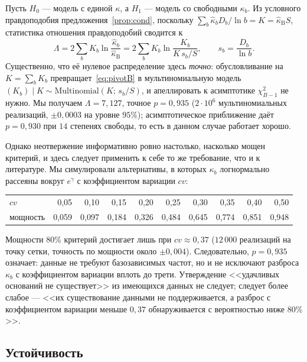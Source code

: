 \documentclass[11pt,a4paper]{article}
\theoremstyle{plain}
\theoremstyle{remark}
\newcommand{\eg}{e^{\gamma}}
\begin{document}
Пусть $H_0$ --- модель с единой $\kappa$, а $H_1$ --- модель со свободными $\kappa_b$.
Из условного правдоподобия предложения~\ref{prop:cond}, поскольку
$\sum_b\hat\kappa_bD_b/\ln b=K=\hat\kappa_{\mathrm B}S$, статистика
отношения правдоподобий сводится к
\begin{equation}\label{eq:LR}
\Lambda=2\sum_b K_b \ln\frac{\hat\kappa_b}{\hat\kappa_{\mathrm B}}
=2\sum_b K_b\ln\frac{K_b}{K\,s_b/S},\qquad s_b=\frac{D_b}{\ln b}.
\end{equation}
Существенно, что её нулевое распределение здесь \emph{точно}: обусловливание на
$K=\sum_bK_b$ превращает~\eqref{eq:pivotB} в мультиномиальную модель
$(K_b)\mid K\sim\mathrm{Multinomial}(K;\,s_b/S)$, и апеллировать к асимптотике
$\chi^2_{B-1}$ не нужно. Мы получаем $\Lambda=7{,}127$, точное $p=0{,}935$
($2\cdot10^6$ мультиномиальных реализаций, $\pm0{,}0003$ на уровне $95\%$); асимптотическое
приближение даёт $p=0{,}930$ при $14$ степенях свободы, то есть в данном случае
работает хорошо.

Однако неотвержение информативно ровно настолько, насколько мощен критерий, и здесь
следует применить к себе то же требование, что и к литературе. Мы симулировали
альтернативы, в которых $\kappa_b$ логнормально рассеяны вокруг $\eg$ с коэффициентом
вариации $cv$:

\begin{center}
\small
\begin{tabular}{lrrrrrrrrr}
\toprule
$cv$ & 0{,}05 & 0{,}10 & 0{,}15 & 0{,}20 & 0{,}25 & 0{,}30 & 0{,}35 & 0{,}40 & 0{,}50\\
мощность & 0{,}059 & 0{,}097 & 0{,}184 & 0{,}326 & 0{,}484 & 0{,}645 & 0{,}774 & 0{,}851 & 0{,}948\\
\bottomrule
\end{tabular}
\end{center}

Мощности $80\%$ критерий достигает лишь при $cv\approx0{,}37$ ($12\,000$ реализаций
на точку сетки, точность по мощности около $\pm0{,}004$). Следовательно,
$p=0{,}935$ означает: данные не требуют базозависимых частот, но и не исключают
разброса $\kappa_b$ с коэффициентом вариации вплоть до трети. Утверждение
<<удачливых оснований не существует>> из имеющихся данных не следует; следует более
слабое --- <<их существование данными не поддерживается, а разброс с коэффициентом
вариации меньше $0{,}37$ обнаруживается с вероятностью ниже $80\%$>>.

\subsection{Устойчивость}\label{sec:robust}
\end{document}
